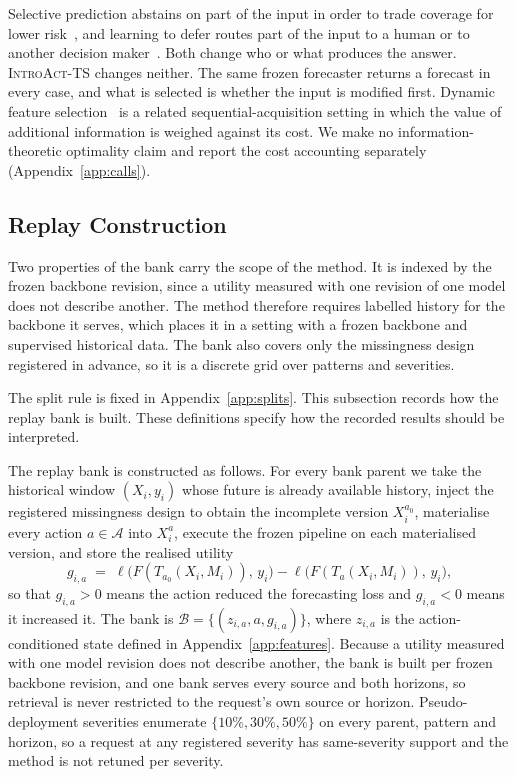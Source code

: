 \documentclass{article}
\newcommand{\introact}{\textsc{IntroAct-TS}}
\newcommand{\calA}{\mathcal{A}}
\newcommand{\calB}{\mathcal{B}}
\newcommand{\loss}{\ell}
\begin{document}
Selective prediction abstains on part of the input in order to trade coverage for lower
risk~\citep{chow1970optimum,vovk2005algorithmic,geifman2017selective,lei2018distribution}, and
learning to defer routes part of the input to a human or to another decision
maker~\citep{madras2018predict,mozannar2020consistent}. Both change who or what produces the
answer. \introact{} changes neither. The same frozen forecaster returns a forecast in every
case, and what is selected is whether the input is modified first. Dynamic feature
selection~\citep{he2024dime} is a related sequential-acquisition setting in which the value of
additional information is weighed against its cost. We make no information-theoretic
optimality claim and report the cost accounting separately (Appendix~\ref{app:calls}).

\subsection{Replay Construction}
\label{app:replay}
Two properties of the bank carry the scope of the method. It is indexed by the frozen backbone
revision, since a utility measured with one revision of one model does not describe another.
The method therefore requires labelled history for the backbone it serves, which places it in
a setting with a frozen backbone and supervised historical data. The bank also
covers only the missingness design registered in advance, so it is a discrete grid over
patterns and severities.

The split rule is fixed in Appendix~\ref{app:splits}. This subsection records how the replay bank is built. These definitions specify how the recorded results should be interpreted.

The replay bank is constructed as follows. For every bank parent we take the historical
window $(X_i, y_i)$ whose future is already available history, inject the registered
missingness design to obtain the incomplete version $X_i^{a_0}$, materialise every action
$a \in \calA$ into $X_i^{a}$, execute the frozen pipeline on each materialised version, and
store the realised utility
\begin{equation}
  g_{i,a} \;=\; \loss\big(F(T_{a_0}(X_i, M_i)),\, y_i\big) - \loss\big(F(T_{a}(X_i, M_i)),\, y_i\big),
  \label{eq:app-gain}
\end{equation}
so that $g_{i,a} > 0$ means the action reduced the forecasting loss and $g_{i,a} < 0$ means it
increased it. The bank is
$\calB = \{(z_{i,a}, a, g_{i,a})\}$, where $z_{i,a}$ is the action-conditioned state defined
in Appendix~\ref{app:features}. Because a utility measured with one model revision does not describe another, the bank is
built per frozen backbone revision, and one bank serves every source and both horizons, so
retrieval is never restricted to the request's own source or horizon. Pseudo-deployment
severities enumerate
$\{10\%, 30\%, 50\%\}$ on every parent, pattern and horizon, so a request at any registered
severity has same-severity support and the method is not retuned per severity.
\end{document}
